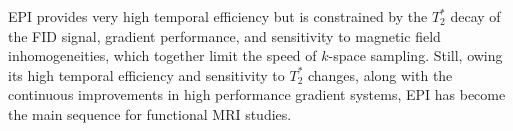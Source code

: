 EPI provides very high temporal efficiency but is constrained by the $T_2^*$ decay of the FID signal, gradient performance, and sensitivity to magnetic field inhomogeneities, which together limit the speed of $k$-space sampling. Still, owing its high temporal efficiency and sensitivity to $T_{2}^{*}$ changes, along with the continuous improvements in high performance gradient systems, EPI has become the main sequence for functional MRI studies.
